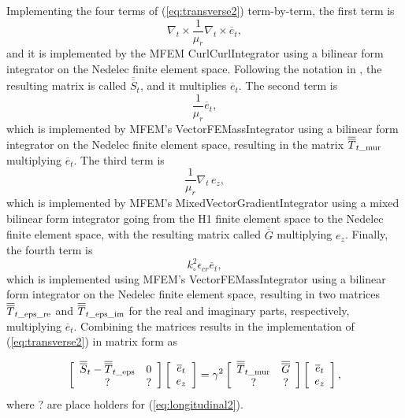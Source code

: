 \documentclass[titlepage]{article}
\renewcommand\_{\textunderscore\linebreak[1]}
\begin{document}
Implementing the four terms of (\ref{eq:transverse2}) term-by-term, the first term is
\begin{equation}
\nabla_t\times\frac{1}{\mu_r}\nabla_t\times\overline{e}_t,
\end{equation}
and it is implemented by the MFEM CurlCurlIntegrator using a bilinear form integrator on the Nedelec finite element space.  Following the notation in \cite{Lee}, the resulting matrix is called $\overline{\overline{S}}_t$, and it multiplies $\overline{e}_t$.  The second term is 
\begin{equation}
\frac{1}{\mu_r}\overline{e}_t,
\end{equation}
which is implemented by MFEM's VectorFEMassIntegrator using a bilinear form integrator on the Nedelec finite element space, resulting in the matrix
$\overline{\overline{T}}_{t\textnormal{\_mur}}$
multiplying $\overline{e}_t$.  The third term is 
\begin{equation}
\frac{1}{\mu_r}\nabla_t \, e_z,
\end{equation}
which is implemented by MFEM's MixedVectorGradientIntegrator using a mixed bilinear form integrator going from the H1 finite element space to the Nedelec finite element space, with the resulting matrix called $\overline{\overline{G}}$ multiplying $e_z$.  Finally, the fourth term is 
\begin{equation}
k_{\circ}^2 \epsilon_{cr}\overline{e}_t,
\end{equation}
which is implemented using MFEM's VectorFEMassIntegrator using a bilinear form integrator on the Nedelec finite element space, resulting in two matrices $\overline{\overline{T}}_{t\textnormal{\_eps\_re}}$ and $\overline{\overline{T}}_{t\textnormal{\_eps\_im}}$ for the real and imaginary parts, respectively,  multiplying $\overline{e}_t$.
Combining the matrices results in the implementation of (\ref{eq:transverse2}) in matrix form as

\begin{equation}
\label{eq:eigen1}
\left[ \begin{array}{cc}
  \overline{\overline{S}}_t - \overline{\overline{T}}_{t\textnormal{\_eps}} & 0 \\
  ? & ? \\
\end{array} \right]
\left[ \begin{array}{c}
  \overline{e}_t \\
  e_z \\
\end{array} \right] = \gamma^2
\left[ \begin{array}{cc}
   \overline{\overline{T}}_{t\textnormal{\_mur}} & \overline{\overline{G}} \\
   ? & ? \\
\end{array} \right]
\left[ \begin{array}{c}
  \overline{e}_t \\
  e_z \\
\end{array} \right],
\end{equation}
where ? are place holders for (\ref{eq:longitudinal2}).
\end{document}
